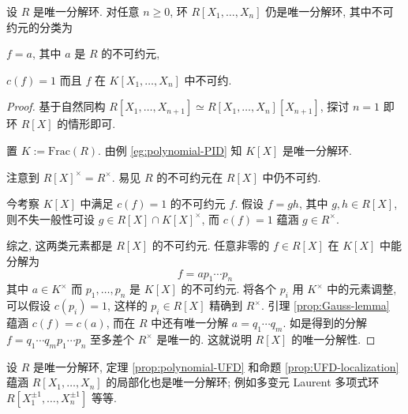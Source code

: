 \begin{theorem}\label{prop:polynomial-UFD}
	设 $R$ 是唯一分解环. 对任意 $n \geq 0$, 环 $R[X_1, \ldots, X_n]$ 仍是唯一分解环, 其中不可约元的分类为
	\begin{compactenum}[(a)]
		\item $f = a$, 其中 $a$ 是 $R$ 的不可约元,
		\item $c(f)=1$ 而且 $f$ 在 $K[X_1, \ldots, X_n]$ 中不可约.
	\end{compactenum}
\end{theorem}
\begin{proof}
	基于自然同构 $R[X_1, \ldots, X_{n+1}] \simeq R[X_1, \ldots, X_n][X_{n+1}]$, 探讨 $n=1$ 即环 $R[X]$ 的情形即可.

	置 $K := \text{Frac}(R)$. 由例 \ref{eg:polynomial-PID} 知 $K[X]$ 是唯一分解环.
	\begin{inparaenum}[(a)]
		\item 注意到 $R[X]^\times = R^\times$. 易见 $R$ 的不可约元在 $R[X]$ 中仍不可约.
		\item 今考察 $K[X]$ 中满足 $c(f)=1$ 的不可约元 $f$. 假设 $f = gh$, 其中 $g, h \in R[X]$, 则不失一般性可设 $g \in R[X] \cap K[X]^\times$, 而 $c(f)=1$ 蕴涵 $g \in R^\times$.
	\end{inparaenum}
	综之, 这两类元素都是 $R[X]$ 的不可约元. 任意非零的 $f \in R[X]$ 在 $K[X]$ 中能分解为
	\[ f = a p_1 \cdots p_n \]
	其中 $a \in K^\times$ 而 $p_1, \ldots, p_n$ 是 $K[X]$ 的不可约元. 将各个 $p_i$ 用 $K^\times$ 中的元素调整, 可以假设 $c(p_i)=1$, 这样的 $p_i \in R[X]$ 精确到 $R^\times$. 引理 \ref{prop:Gauss-lemma} 蕴涵 $c(f)=c(a)$, 而在 $R$ 中还有唯一分解 $a = q_1 \cdots q_m$. 如是得到的分解 $f = q_1 \cdots q_m p_1 \cdots p_n$ 至多差个 $R^\times$ 是唯一的. 这就说明 $R[X]$ 的唯一分解性.
\end{proof}

\begin{example}
	设 $R$ 是唯一分解环, 定理 \ref{prop:polynomial-UFD} 和命题 \ref{prop:UFD-localization} 蕴涵 $R[X_1, \ldots, X_n]$ 的局部化也是唯一分解环; 例如多变元 Laurent 多项式环 $R[X_1^{\pm 1}, \ldots, X_n^{\pm 1}]$ 等等.
\end{example}

